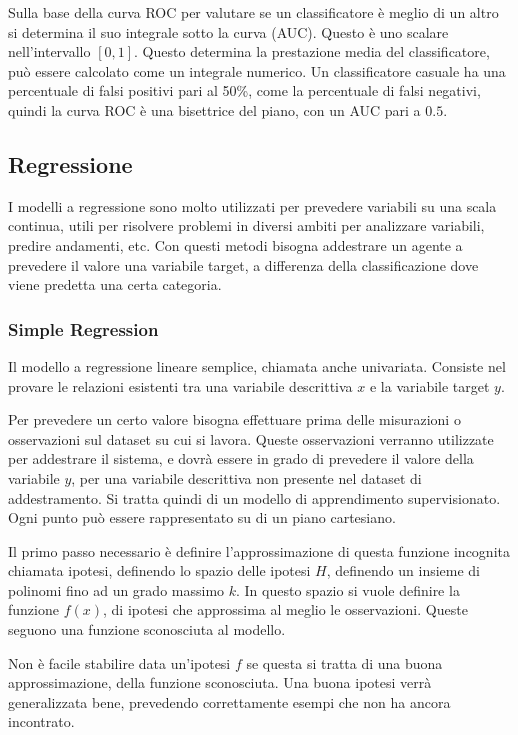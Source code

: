 \documentclass{article}
\numberwithin{equation}{subsection}
\begin{document}
Sulla base della curva ROC per valutare se un classificatore è meglio di un altro si determina il suo integrale sotto la curva (AUC). Questo è uno scalare nell'intervallo $[0,1]$. Questo determina la prestazione media del classificatore, può essere calcolato come un 
integrale numerico. Un classificatore casuale ha una percentuale di falsi positivi pari al 
50\%, come la percentuale di falsi negativi, quindi la curva ROC è una bisettrice del piano, 
con un AUC pari a $0.5$. 

\subsection{Regressione}

I modelli a regressione sono molto utilizzati per prevedere variabili su una scala continua, utili per risolvere problemi in diversi ambiti per analizzare variabili, predire andamenti, 
etc. Con questi metodi bisogna addestrare un agente a prevedere il valore una variabile target, a differenza della classificazione dove viene predetta una certa categoria. 

\subsubsection{Simple Regression}

Il modello a regressione lineare semplice, chiamata anche univariata. Consiste nel 
provare le relazioni esistenti tra una variabile descrittiva $x$ e la variabile target $y$. 

Per prevedere un certo valore bisogna effettuare prima delle misurazioni o osservazioni 
sul dataset su cui si lavora. Queste osservazioni verranno utilizzate per addestrare il sistema, e dovrà essere in grado di prevedere il valore della variabile $y$, per una variabile descrittiva non presente nel dataset di addestramento. 
Si tratta quindi di un modello di apprendimento supervisionato. Ogni punto può essere rappresentato su di un piano cartesiano. 

Il primo passo necessario è definire l'approssimazione di questa funzione incognita chiamata 
ipotesi, definendo lo spazio delle ipotesi $H$, definendo un insieme di polinomi fino ad un 
grado massimo $k$. In questo spazio si vuole definire la funzione $f(x)$, di ipotesi che 
approssima al meglio le osservazioni. Queste seguono una funzione sconosciuta al modello. 

Non è facile stabilire data un'ipotesi $f$ se questa si tratta di una buona approssimazione, della funzione sconosciuta. Una buona ipotesi verrà generalizzata bene, prevedendo 
correttamente esempi che non ha ancora incontrato. 
\end{document}
